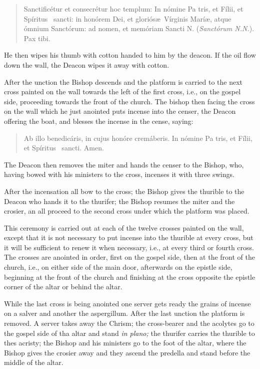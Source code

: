 \documentclass[letterpaper]{report}
\newcommand\blessincense{
\begin{quote}
   Ab illo benedicáris, in cujus honóre cremáberis. In nómine Pa\cross
    tris, et Fí\cross lii, et Spíritus \cross\ sancti. \rbar Amen.
\end{quote}
}
\begin{document}
{\begin{quote}
    Sancti\cross ficétur et conse\cross crétur hoc templum: In nómine Pa\cross
    tris, et Fí\cross lii, et Spíritus \cross\ sancti: in honórem Dei, et
    gloriós\ae\ Vírginis Marí\ae, atque ómnium Sanctórum: ad nomen, et memóriam
    Sancti N. (\textit{Sanctórum N.N.}). Pax tibi.
\end{quote}

He then wipes his thumb with cotton handed to him by the deacon. If the oil
flow down the wall, the Deacon wipes it away with cotton.

After the unction the Bishop descends and the platform is carried to the next
cross painted on the wall towards the left of the first cross, i.e., on the
gospel side, proceeding towards the front of the church. The bishop then facing
the cross on the wall which he just anointed puts incense into the censer, the
Deacon offering the boat, and blesses the incense in the cense, saying: 

\blessincense

The Deacon then removes the miter and hands the censer to the Bishop, who,
having bowed with his ministers to the cross, incenses it with three swings.

After the incensation all bow to the cross; the Bishop gives the thurible to
the Deacon who hands it to the thurifer; the Bishop resumes the miter and the
crosier, an all proceed to the second cross under which the platform was
placed.

\rubric This ceremony is carried out at each of the twelve crosses painted on
the wall, except that it is not necessary to put incense into the thurible at
every cross, but it will be sufficient to renew it when necessary, i.e., at
every third or fourth cross. The crosses are anointed in order, first on the
gospel side, then at the front of the church, i.e., on either side of the main
door, afterwards on the epistle side, beginning at the front of the church and
finishing at the cross opposite the epistle corner of the altar or behind the
altar.

\rubric While the last cross is being anointed one server gets ready the
grains of incense on a salver and another the aspergillum. After the last
unction the platform is removed. A server takes away the Chrism; the
cross-bearer and the acolytes go to the gospel side of tha altar and stand
\textit{in plano;} the thurifer carries the thurible to thes acristy; the
Bishop and his ministers go to the foot of the altar, where the Bishop gives
the crosier away and they ascend the predella and stand before the middle of
the altar.

}
\end{document}

